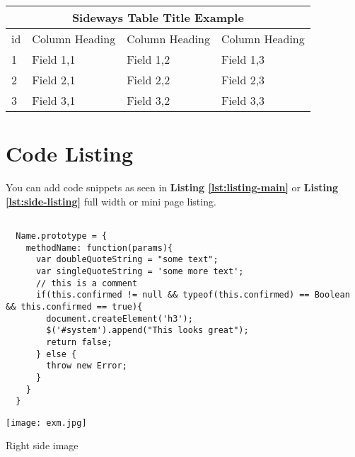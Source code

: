 \begin{sidewaystable}
  \begin{tabular}{ |p{0.5cm}|p{7cm}|p{7cm}|p{7cm}|  }
    \hline
        \multicolumn{4}{|c|}{Sideways Table Title Example} \\
     \hline
        \multicolumn{1}{|c|}{id} &
        \multicolumn{1}{|c|}{Column Heading} &
        \multicolumn{1}{|c|}{Column Heading} &
        \multicolumn{1}{|c|}{Column Heading}  \\
     \hline
        1 & Field 1,1 & Field 1,2 & Field 1,3 \\
     \hline
        2 & Field 2,1 & Field 2,2 & Field 2,3 \\
     \hline
        3 & Field 3,1 & Field 3,2 & Field 3,3 \\
     \hline

  \end{tabular}
  \label{tab:mySidewaysTable}
\end{sidewaystable}


\section{Code Listing}
\label{sec:code-listing}

You can add code snippets as seen in \textbf{Listing \ref{lst:listing-main}} or \textbf{Listing \ref{lst:side-listing}} full width or mini page listing.

\begin{minipage}{.5\textwidth}
  \begin{listing}[H]
  \begin{verbatim}

  Name.prototype = {
    methodName: function(params){
      var doubleQuoteString = "some text";
      var singleQuoteString = 'some more text';
      // this is a comment
      if(this.confirmed != null && typeof(this.confirmed) == Boolean && this.confirmed == true){
        document.createElement('h3');
        $('#system').append("This looks great");
        return false;
      } else {
        throw new Error;
      }
    }
  }

  \end{verbatim}
  \label{lst:label-for-listing}
  \end{listing}
\end{minipage}%
\begin{minipage}{0.5\textwidth}
	\centering
	\texttt{[image: exm.jpg]}
	\caption{Right side image}
	\label{fig:right-side-minipage}
\end{minipage}

